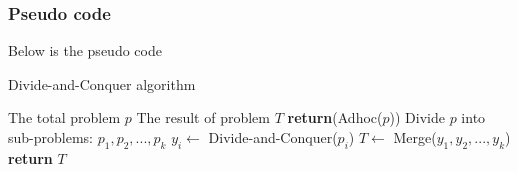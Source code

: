 \documentclass[cs4size, punct, nospace, fancyhdr, fntef]{ctexart}
\begin{document}
      \subsubsection{Pseudo code}
        Below is the pseudo code
        \begin{algorithm}
        \caption{Divide-and-Conquer algorithm}\label{dnc}
        \begin{algorithmic}[1] %
        \Require The total problem $p$
        \Ensure The result of problem $T$
            \State \textbf{return}(Adhoc($p$))
          \EndIf
          \State Divide $p$ into sub-problems: ${p_1, p_2, ..., p_k}$
            \State $y_i\gets$ Divide-and-Conquer($p_i$)
          \EndFor
          \State $T\gets$ Merge($y_1, y_2, ..., y_k$)
          \State \textbf{return} $T$
        \EndFunction
        \end{algorithmic}
        \end{algorithm}
\end{document}

